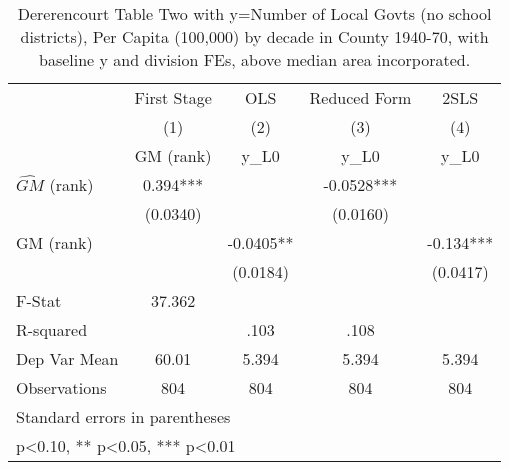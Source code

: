 \begin{table}[htbp]\centering
\def\sym#1{\ifmmode^{#1}\else\(^{#1}\)\fi}
\caption{Dererencourt Table Two with y=Number of Local Govts (no school districts), Per Capita (100,000) by decade in County 1940-70, with baseline y and division FEs, above median area incorporated.}
\begin{tabular}{l*{4}{c}}
\toprule
                    & First Stage   &         OLS   &Reduced Form   &        2SLS   \\
                    &\multicolumn{1}{c}{(1)}&\multicolumn{1}{c}{(2)}&\multicolumn{1}{c}{(3)}&\multicolumn{1}{c}{(4)}\\
                    &\multicolumn{1}{c}{GM  (rank)}&\multicolumn{1}{c}{y\_L0}&\multicolumn{1}{c}{y\_L0}&\multicolumn{1}{c}{y\_L0}\\
\midrule
$\hat{GM}$ (rank)   &       0.394***&               &     -0.0528***&               \\
                    &    (0.0340)   &               &    (0.0160)   &               \\
\addlinespace
GM  (rank)          &               &     -0.0405** &               &      -0.134***\\
                    &               &    (0.0184)   &               &    (0.0417)   \\
\midrule
F-Stat              &      37.362   &               &               &               \\
R-squared           &               &        .103   &        .108   &               \\
Dep Var Mean        &       60.01   &       5.394   &       5.394   &       5.394   \\
Observations        &         804   &         804   &         804   &         804   \\
\bottomrule
\multicolumn{5}{l}{\footnotesize Standard errors in parentheses}\\
\multicolumn{5}{l}{\footnotesize * p<0.10, ** p<0.05, *** p<0.01}\\
\end{tabular}
\end{table}
